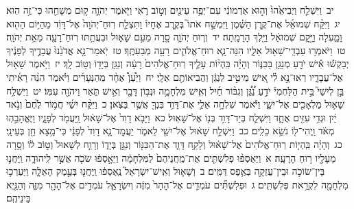 \documentclass[18pt]{article}
\newcommand{\kri}[1]{\Afootnote{#1}}	%
\begin{document}
 {\loc יב~}וַיִּשְׁלַ֤ח וַיְבִיאֵ֙הוּ֙ וְה֣וּא אַדְמוֹנִ֔י עִם־יְפֵ֥ה עֵינַ֖יִם וְט֣וֹב רֹ֑אִי \edtext{{פ}
}{\kri{פסקא באמצע פסוק}שמואל א טז יב} וַיֹּ֧אמֶר יְהֹוָ֛ה ק֥וּם מְשָׁחֵ֖הוּ כִּי־זֶ֥ה הֽוּא׃ \startlock
 {\loc יג~}וַיִּקַּ֨ח שְׁמוּאֵ֜ל אֶת־קֶ֣רֶן הַשֶּׁ֗מֶן וַיִּמְשַׁ֣ח אֹתוֹ֮ בְּקֶ֣רֶב אֶחָיו֒ וַתִּצְלַ֤ח רֽוּחַ־יְהֹוָה֙ אֶל־דָּוִ֔ד מֵהַיּ֥וֹם הַה֖וּא וָמָ֑עְלָה וַיָּ֣קׇם שְׁמוּאֵ֔ל וַיֵּ֖לֶךְ הָרָמָֽתָה׃ \startlock
 {\loc יד~}וְר֧וּחַ יְהֹוָ֛ה סָ֖רָה מֵעִ֣ם שָׁא֑וּל וּבִעֲתַ֥תּוּ רֽוּחַ־רָעָ֖ה מֵאֵ֥ת יְהֹוָֽה׃ \startlock
 {\loc טו~}וַיֹּאמְר֥וּ עַבְדֵֽי־שָׁא֖וּל אֵלָ֑יו הִנֵּה־נָ֧א רוּחַ־אֱלֹהִ֛ים רָעָ֖ה מְבַעִתֶּֽךָ׃ \startlock
 {\loc טז~}יֹֽאמַר־נָ֤א אֲדֹנֵ֙נוּ֙ עֲבָדֶ֣יךָ לְפָנֶ֔יךָ יְבַקְשׁ֕וּ אִ֕ישׁ יֹדֵ֖עַ מְנַגֵּ֣ן בַּכִּנּ֑וֹר וְהָיָ֗ה בִּֽהְי֨וֹת עָלֶ֤יךָ רֽוּחַ־אֱלֹהִים֙ רָעָ֔ה וְנִגֵּ֥ן בְּיָד֖וֹ וְט֥וֹב לָֽךְ׃ \startlock
 {\loc יז~}וַיֹּ֥אמֶר שָׁא֖וּל אֶל־עֲבָדָ֑יו רְאוּ־נָ֣א לִ֗י אִ֚ישׁ מֵיטִ֣יב לְנַגֵּ֔ן וַהֲבִיאוֹתֶ֖ם אֵלָֽי׃ \startlock
 {\loc יח~}וַיַּ֩עַן֩ אֶחָ֨ד מֵהַנְּעָרִ֜ים וַיֹּ֗אמֶר הִנֵּ֨ה רָאִ֜יתִי בֵּ֣ן לְיִשַׁי֮ בֵּ֣ית הַלַּחְמִי֒ יֹדֵ֣עַ נַ֠גֵּ֠ן וְגִבּ֨וֹר חַ֜יִל וְאִ֧ישׁ מִלְחָמָ֛ה וּנְב֥וֹן דָּבָ֖ר וְאִ֣ישׁ תֹּ֑אַר וַיהֹוָ֖ה עִמּֽוֹ׃ \startlock
 {\loc יט~}וַיִּשְׁלַ֥ח שָׁא֛וּל מַלְאָכִ֖ים אֶל־יִשָׁ֑י וַיֹּ֕אמֶר שִׁלְחָ֥ה אֵלַ֛י אֶת־דָּוִ֥ד בִּנְךָ֖ אֲשֶׁ֥ר בַּצֹּֽאן׃ \startlock
 {\loc כ~}וַיִּקַּ֨ח יִשַׁ֜י חֲמ֥וֹר לֶ֙חֶם֙ וְנֹ֣אד יַ֔יִן וּגְדִ֥י עִזִּ֖ים אֶחָ֑ד וַיִּשְׁלַ֛ח בְּיַד־דָּוִ֥ד בְּנ֖וֹ אֶל־שָׁאֽוּל׃ \startlock
 {\loc כא~}וַיָּבֹ֤א דָוִד֙ אֶל־שָׁא֔וּל וַֽיַּעֲמֹ֖ד לְפָנָ֑יו וַיֶּאֱהָבֵ֣הֽוּ מְאֹ֔ד וַֽיְהִי־ל֖וֹ נֹשֵׂ֥א כֵלִֽים׃ \startlock
 {\loc כב~}וַיִּשְׁלַ֣ח שָׁא֔וּל אֶל־יִשַׁ֖י לֵאמֹ֑ר יַעֲמׇד־נָ֤א דָוִד֙ לְפָנַ֔י כִּי־מָ֥צָא חֵ֖ן בְּעֵינָֽי׃ \startlock
 {\loc כג~}וְהָיָ֗ה בִּֽהְי֤וֹת רֽוּחַ־אֱלֹהִים֙ אֶל־שָׁא֔וּל וְלָקַ֥ח דָּוִ֛ד אֶת־הַכִּנּ֖וֹר וְנִגֵּ֣ן בְּיָד֑וֹ וְרָוַ֤ח לְשָׁאוּל֙ וְט֣וֹב ל֔וֹ וְסָ֥רָה מֵעָלָ֖יו ר֥וּחַ הָרָעָֽה׃ 
\startlock
 {\loc א~}וַיַּאַסְפ֨וּ פְלִשְׁתִּ֤ים אֶת־מַֽחֲנֵיהֶם֙ לַמִּלְחָמָ֔ה וַיֵּאָ֣סְפ֔וּ שֹׂכֹ֖ה אֲשֶׁ֣ר לִֽיהוּדָ֑ה וַֽיַּחֲנ֛וּ בֵּין־שׂוֹכֹ֥ה וּבֵין־עֲזֵקָ֖ה בְּאֶ֥פֶס דַּמִּֽים׃ \startlock
 {\loc ב~}וְשָׁא֤וּל וְאִֽישׁ־יִשְׂרָאֵל֙ נֶֽאֶסְפ֔וּ וַֽיַּחֲנ֖וּ בְּעֵ֣מֶק הָאֵלָ֑ה וַיַּעַרְכ֥וּ מִלְחָמָ֖ה לִקְרַ֥את פְּלִשְׁתִּֽים׃ \startlock
 {\loc ג~}וּפְלִשְׁתִּ֞ים עֹמְדִ֤ים אֶל־הָהָר֙ מִזֶּ֔ה וְיִשְׂרָאֵ֛ל עֹמְדִ֥ים אֶל־הָהָ֖ר מִזֶּ֑ה וְהַגַּ֖יְא בֵּינֵיהֶֽם׃ \startlock
\end{document}
